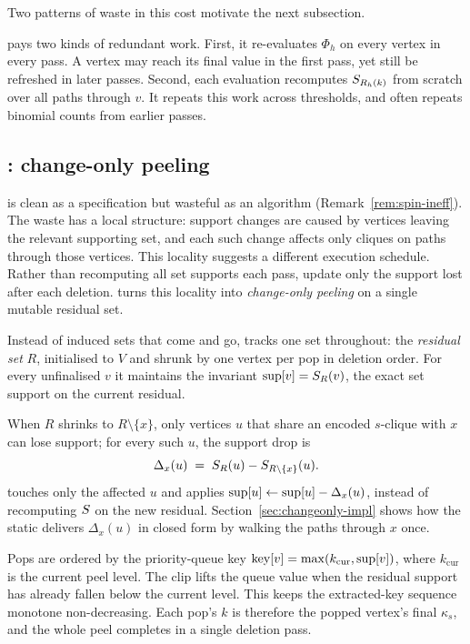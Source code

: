 Two patterns of waste in this cost motivate the next subsection.

\begin{remark}\label{rem:spin-ineff}
\spin{} pays two kinds of redundant work.
%
First, it re-evaluates $\Phi_h$ on every vertex in every pass.
%
A vertex may reach its final value in the first pass, yet still be refreshed in later passes.
%
Second, each evaluation recomputes $S_{R_h(k)}$ from scratch over all paths through $v$.
%
It repeats this work across thresholds, and often repeats binomial counts from earlier passes.
\end{remark}

\subsection{\texorpdfstring{\spinStar{}: change-only peeling}{SPIN-star: change-only peeling}}\label{sec:peelh}

\spin{} is clean as a specification but wasteful as an algorithm (Remark~\ref{rem:spin-ineff}).
%
The waste has a local structure: support changes are caused by vertices leaving the relevant supporting set, and each such change affects only cliques on paths through those vertices.
%
This locality suggests a different execution schedule.
%
Rather than recomputing all set supports each pass, update only the support lost after each deletion.
%
\spinStar{} turns this locality into \emph{change-only peeling} on a single mutable residual set.

Instead of induced sets that come and go, \spinStar{} tracks one set throughout: the \emph{residual set} $R$, initialised to $V$ and shrunk by one vertex per pop in deletion order.
%
For every unfinalised $v$ it maintains the invariant $\mathrm{sup}[v]=S_R(v)$, the exact set support on the current residual.

When $R$ shrinks to $R\setminus\{x\}$, only vertices $u$ that share an encoded $s$-clique with $x$ can lose support; for every such $u$, the support drop is
\[
  \Delta_x(u) \;=\; S_R(u) - S_{R\setminus\{x\}}(u).
\]
\spinStar{} touches only the affected $u$ and applies $\mathrm{sup}[u]\gets\mathrm{sup}[u]-\Delta_x(u)$, instead of recomputing $S$ on the new residual.
%
Section~\ref{sec:changeonly-impl} shows how the static \cpi{} delivers $\Delta_x(u)$ in closed form by walking the paths through $x$ once.

Pops are ordered by the priority-queue key $\mathrm{key}[v]=\max(k_{\mathrm{cur}},\mathrm{sup}[v])$, where $k_{\mathrm{cur}}$ is the current peel level.
%
The clip lifts the queue value when the residual support has already fallen below the current level.
%
This keeps the extracted-key sequence monotone non-decreasing.
%
Each pop's $k$ is therefore the popped vertex's final $\kappa_s$, and the whole peel completes in a single deletion pass.

